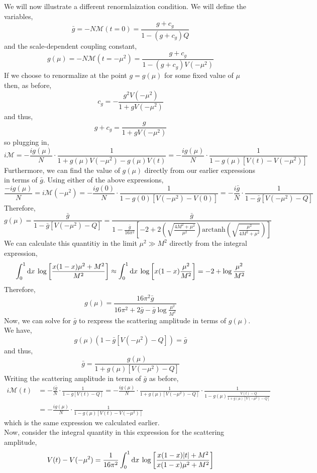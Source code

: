 \documentclass[12pt]{article}
\begin{document}
We will now illustrate a different renormlaization condition. We will define the variables, 
\[\bar{g} = - N \mathcal{M}(t = 0) = \frac{g + c_g}{1 - (g + c_g) Q} \]
and the scale-dependent coupling constant,
\[ g(\mu) = - N \mathcal{M}(t = -\mu^2) = \frac{g + c_g}{1 - (g + c_g) V(-\mu^2)} \]
If we choose to renormalize at the point $ g = g(\mu)$ for some fixed value of $\mu$ then, as before,
\[ c_g = -\frac{g^2 V(-\mu^2)}{1 + g V(-\mu^2)} \]
and thus,
\[ g + c_g = \frac{g}{1 + g V(-\mu^2)} \]
so plugging in,
\[ i\mathcal{M} = - \frac{ig(\mu)}{N} \cdot  \frac{1}{1 + g(\mu) V(-\mu^2) - g(\mu) V(t)} = - \frac{ig(\mu)}{N} \cdot \frac{1}{1 - g(\mu) [ V(t) - V(-\mu^2)]} \]
Furthermore, we can find the value of $g(\mu)$ directly from our earlier expressions in terms of $\bar{g}$. Using either of the above expressions,
\[ \frac{-i g(\mu)}{N} = i \mathcal{M}(-\mu^2) = - \frac{i g(0)}{N} \cdot \frac{1}{1 - g(0) [ V(-\mu^2) - V(0)]} = - \frac{i \bar{g}}{N} \cdot \frac{1}{1 - \bar{g} [ V(-\mu^2) - Q]} \]
Therefore,
\[ g(\mu) = \frac{\bar{g}}{1 - \bar{g} [V(-\mu^2) - Q]} = \frac{\bar{g}}{1 - \frac{\bar{g}}{16 \pi^2} \left[ -2 + 2 \left( \sqrt{\frac{4 M^2 + \mu^2}{\mu^2}} \right) \mathrm{arctanh} \left( \sqrt{\frac{\mu^2}{4 M^2 + \mu^2}} \right) \right] } \]
We can calculate this quantitiy in the limit $\mu^2 \gg M^2$ directly from the integral expression,
\[\int_0^1 \mathrm{d}x \: \log{\left[ \frac{x(1-x)\mu^2 + M^2}{M^2} \right]} \approx \int_0^1 \mathrm{d}x \: \log{\left[ x(1 - x) \frac{\mu^2}{M^2} \right]} = -2 + \log{\frac{\mu^2}{M^2}}\]
Therefore,
\[ g(\mu) = \frac{16 \pi^2 \bar{g}}{16 \pi^2 + 2 \bar{g} - \bar{g} \log{\frac{\mu^2}{M^2}}} \]
Now, we can solve for $\bar{g}$ to rexpress the scattering amplitude in terms of $g(\mu)$. 
We have,
\[ g(\mu) (1 - \bar{g} [V(-\mu^2) - Q]) = \bar{g} \]
and thus,
\[ \bar{g} = \frac{g(\mu)}{1 + g(\mu) [ V(-\mu^2) - Q]}\]
Writing the scattering amplitude in terms of $\bar{g}$ as before,
\begin{align*}
i \mathcal{M}(t) &= -\frac{i\bar{g}}{N} \cdot \frac{1}{1 - \bar{g} [V(t) - Q]} = -\frac{ig(\mu)}{N} \cdot \frac{1}{1 + g(\mu) [ V(-\mu^2) - Q]} \cdot \frac{1}{1 - g(\mu) \frac{V(t) - Q}{1 + g(\mu) [ V(-\mu^2) - Q] }}
\\
& = - \frac{i g(\mu)}{N} \cdot \frac{1}{1 - g(\mu)[V(t) - V(-\mu^2)]}
\end{align*}
which is the same expression we calculated earlier. \bigskip\\
Now, consider the integral quantity in this expression for the scattering amplitude,
\[ V(t) - V(-\mu^2) = \frac{1}{16 \pi^2} \int_0^1 \mathrm{d}x \: \log{\left[\frac{x(1-x)|t| + M^2}{x(1-x) \mu^2 + M^2}\right]}\]
\end{document}
